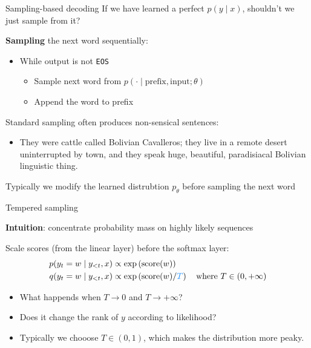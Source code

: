 \documentclass[usenames,dvipsnames,notes,11pt,aspectratio=169,hyperref={colorlinks=true, linkcolor=blue}]{beamer}
\begin{document}
\begin{frame}
    {Sampling-based decoding}
    If we have learned a perfect $p(y\mid x)$, shouldn't we just sample from it?

    \textbf{Sampling} the next word sequentially:\\
    \begin{itemize}
        \item While output is not \texttt{EOS}
            \begin{itemize}
                \item Sample next word from $p(\cdot\mid \text{prefix}, \text{input};\theta)$
                \item Append the word to prefix
            \end{itemize}
    \end{itemize}

    \pause
    Standard sampling often produces non-sensical sentences:\\
    \begin{itemize}
        \item[] {\footnotesize They were cattle called Bolivian Cavalleros; they live in a remote desert uninterrupted by town, and they speak huge, beautiful, paradisiacal Bolivian linguistic thing.}
    \end{itemize}

    Typically we modify the learned distrubtion $p_\theta$ before sampling the next word
\end{frame}

\begin{frame}
    {Tempered sampling}

    \textbf{Intuition}: concentrate probability mass on highly likely sequences 

    Scale scores (from the linear layer) before the softmax layer:\\
    \begin{align*}
        p(y_t=w \mid y_{<t},x) &\propto \exp\p{\mathrm{score}(w)}\\
        q(y_t=w \mid y_{<t}, x) &\propto \exp\p{\mathrm{score}(w)/{\color{blue}T}} 
        \quad \text{where } T\in(0, +\infty)
    \end{align*}
    \pause
    \vspace{-2em}
    \begin{itemize}
        \item What happends when $T\to 0$ and $T\to +\infty$?
        \item Does it change the rank of $y$ according to likelihood?
        \item Typically we chooose $T\in (0, 1)$, which makes the distribution more peaky.
    \end{itemize}
\end{frame}
\end{document}
